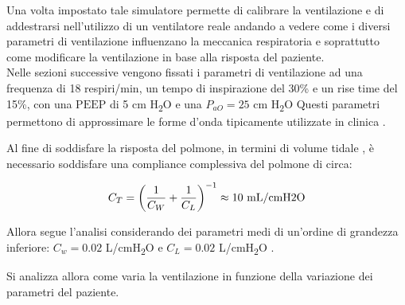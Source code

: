 Una volta impostato tale simulatore permette di calibrare la ventilazione e di addestrarsi nell'utilizzo di un ventilatore reale andando a vedere come i diversi parametri di ventilazione influenzano la meccanica respiratoria e soprattutto come modificare la ventilazione in base alla risposta del paziente.
\\

Nelle sezioni successive vengono fissati i parametri di ventilazione \cite{truwit_modes_2011} ad una frequenza di 18 respiri/min, un tempo di inspirazione del 30\% e un rise time del 15\%, con una $\mathrm{PEEP}$ di 5 cm H\textsubscript{2}O e una $P_{aO}=25$  cm H\textsubscript{2}O Questi parametri permettono di approssimare le forme d'onda tipicamente utilizzate in clinica \cite{al-naggar_modelling_2015}. 

Al fine di soddisfare la risposta del polmone, in termini di volume tidale \cite{ventilation_2000}, è necessario soddisfare una compliance complessiva del polmone di circa:

\begin{equation}
	C_{T}=\left({1 \over C_{W}}+{1 \over C_{L}}\right)^{-1}\approx 10 \text{ mL/cmH2O}
\end{equation}

Allora segue l'analisi considerando dei parametri medi di un'ordine di grandezza inferiore: $C_w=0.02$ L/cmH\textsubscript{2}O e $C_L=0.02$ L/cmH\textsubscript{2}O .

Si analizza allora come varia la ventilazione in funzione della variazione dei parametri del paziente. 

